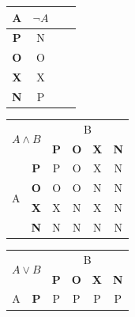 \documentclass[11pt,a4paper]{article}
\begin{document}
        \begin{table}[h]
            \centering
            \begin{tabular}[p]{|c|c|cl}
                \hline
                A               & $\neg{A}$  \\ \hline
                \textbf{P}      & N       \\ \hline
                \textbf{O}      & O       \\ \hline
                \textbf{X}      & X       \\ \hline
                \textbf{N}      & P       \\ \hline
            \end{tabular}
            \begin{tabular}[p]{|c|c|c|c|c|c|}
                \hline
                \multicolumn{2}{|l|}{\multirow{2}{*}{$A \wedge B$ }} & \multicolumn{4}{c|}{B}               \\
                \cline{3-6}
                \multicolumn{2}{|l|}{}                  & \textbf{P} & \textbf{O} & \textbf{X} & \textbf{N}  \\
                \cline{1-2}\cline{3-6}
                \multirow{4}{*}{A} & \textbf{P}         & P          & O          & X          & N           \\
                \cline{2-6}
                                   & \textbf{O}         & O          & O          & N          & N           \\
                \cline{2-6}
                                   & \textbf{X}         & X          & N          & X          & N           \\
                \cline{2-6}
                                   & \textbf{N}         & N          & N          & N          & N           \\
                \hline
            \end{tabular}
            \begin{tabular}[p]{|c|c|c|c|c|c|}
                \hline
                \multicolumn{2}{|l|}{\multirow{2}{*}{$A \vee B$ }} & \multicolumn{4}{c|}{B}                             \\
                \cline{3-6}
                \multicolumn{2}{|l|}{}                             & \textbf{P} & \textbf{O} & \textbf{X} & \textbf{N}  \\
                \hline
                \multirow{4}{*}{A} & \textbf{P}                    & P          & P          & P          & P           \\

\end{tabular}
\end{table}
\end{document}
